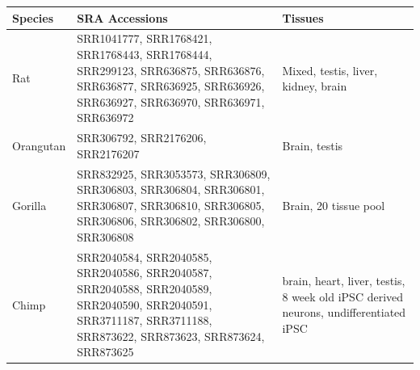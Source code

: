 \documentclass[fleqn,10pt]{wlscirep}
\begin{document}
\begin{center}
\small
{}
\label{supp_table:rnaseq_sra_table}
\begin{longtable}{|p{}|p{}|p{}|} \hline
Species   & SRA Accessions & Tissues \\ \hline
Rat       & SRR1041777, SRR1768421, SRR1768443, SRR1768444, SRR299123, SRR636875, SRR636876, SRR636877, SRR636925, SRR636926, SRR636927, SRR636970, SRR636971, SRR636972                                                                                                                                                                                                                                                                                   & Mixed, testis, liver, kidney, brain                                                                                   \\ \hline
Orangutan & SRR306792, SRR2176206, SRR2176207                                                                                                                                                                                                                                                                                                                                                                                                              & Brain, testis                                                                                                         \\ \hline
Gorilla   & SRR832925, SRR3053573, SRR306809, SRR306803, SRR306804, SRR306801, SRR306807, SRR306810, SRR306805, SRR306806, SRR306802, SRR306800, SRR306808                                                                                                                                                                                                                                                                                                 & Brain, 20 tissue pool                                                                                                 \\ \hline
Chimp     & SRR2040584, SRR2040585, SRR2040586, SRR2040587, SRR2040588, SRR2040589, SRR2040590, SRR2040591, SRR3711187, SRR3711188, SRR873622, SRR873623, SRR873624, SRR873625                                                                                                                                                                                                                                                                             & brain, heart, liver, testis, 8 week old iPSC derived neurons, undifferentiated iPSC                                   \\ \hline

\end{longtable}
\end{center}
\end{document}
